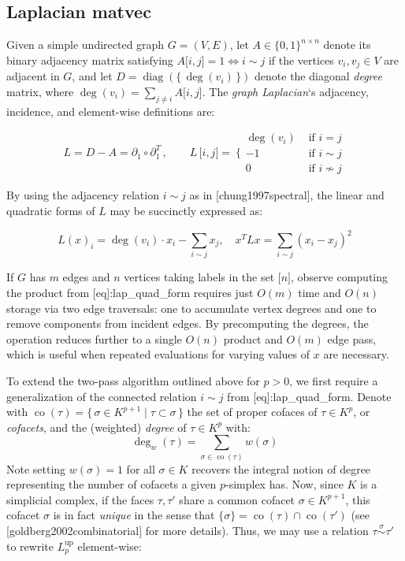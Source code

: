 \subsection{Laplacian matvec}\label{app:lap_matvec}

Given a simple undirected graph \(G = (V,E)\), let \(A \in \{ 0,1\}^{n \times n}\) denote its binary adjacency matrix satisfying \(A\left. \lbrack i,j\rbrack \right. = 1 \Leftrightarrow i \sim j\) if the vertices \(v_{i},v_{j} \in V\) are adjacent in \(G\), and let \(D = \operatorname{diag}\left. \left( \{\,\deg\left( v_{i} \right)\,\} \right) \right.\) denote the diagonal \emph{degree} matrix, where \(\deg\left( v_{i} \right) = \sum_{j \neq i}A\left. \lbrack i,j\rbrack \right.\). The \emph{graph Laplacian}`s adjacency, incidence, and element-wise definitions are:

\[L = D - A = \partial_{1} \circ \partial_{1}^{T}\,,\quad\quad L\,\left. \lbrack i,j\rbrack \right. = \left. \ \{\begin{array}{ll}
\deg\left( v_{i} \right) & \text{ if }i = j \\
 - 1 & \text{ if }i \sim j \\
0 & \text{ if }i \nsim j
\end{array} \right.\]

By using the adjacency relation \(i \sim j\) as in {[}chung1997spectral{]}, the linear and quadratic forms of \(L\) may be succinctly expressed as:

\[{L(x)}_{i} = \deg(v_{i}) \cdot x_{i} - \sum_{i \sim j}x_{j},\quad x^{T}Lx = \sum_{i \sim j}\left( x_{i} - x_{j} \right)^{2}\] \label{eq:lap_quad_form}{}

If \(G\) has \(m\) edges and \(n\) vertices taking labels in the set \(\left. \lbrack n\rbrack \right.\), observe computing the product from {[}eq{]}:lap\_quad\_form requires just \(O(m)\) time and \(O(n)\) storage via two edge traversals: one to accumulate vertex degrees and one to remove components from incident edges. By precomputing the degrees, the operation reduces further to a single \(O(n)\) product and \(O(m)\) edge pass, which is useful when repeated evaluations for varying values of \(x\) are necessary.

To extend the two-pass algorithm outlined above for \(p > 0\), we first require a generalization of the connected relation \(i \sim j\) from {[}eq{]}:lap\_quad\_form. Denote with \(\operatorname{co}(\tau) = \{\,\sigma \in K^{p + 1} \mid \tau \subset \sigma\,\}\) the set of proper cofaces of \(\tau \in K^{p}\), or \emph{cofacets}, and the (weighted) \emph{degree} of \(\tau \in K^{p}\) with: \[\deg_{w}(\tau) = \sum_{\sigma \in \operatorname{co}(\tau)}w(\sigma)\] Note setting \(w(\sigma) = 1\) for all \(\sigma \in K\) recovers the integral notion of degree representing the number of cofacets a given \(p\)-simplex has. Now, since \(K\) is a simplicial complex, if the faces \(\tau,\tau'\) share a common cofacet \(\sigma \in K^{p + 1}\), this cofacet \(\sigma\) is in fact \emph{unique} in the sense that \(\{\sigma\} = \operatorname{co}(\tau) \cap \operatorname{co}(\tau')\) (see {[}goldberg2002combinatorial{]} for more details). Thus, we may use a relation \(\tau\overset{\sigma}{\sim}\tau'\) to rewrite \(L_{p}^{\operatorname{up}}\) element-wise:

